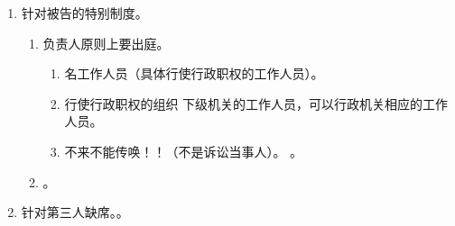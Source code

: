 \begin{enumerate}
\begin{enumerate}
\begin{kk}{一改二撤三裁}
\begin{enumerate}
\begin{enumerate}
                          \end{enumerate}
                    \item 二撤。撤回起诉。
                    \item {}。
                          \begin{enumerate}
                            \item 是原告/上诉人的。
                            \item {}。
                            \item {}。不损害公共利益和他人合法权益。
                            \item {}。
                          \end{enumerate}
                  \end{enumerate}
                  \tcblower
                  \begin{enumerate}
                    \item 新的行为审没审看诉没诉。另行起诉、合并审理。
                    \item 没有后悔药、撤诉裁定错了走再审。
                  \end{enumerate}
                \end{kk}
          \item 针对被告的特别制度。
                \begin{enumerate}
                  \item 负责人原则上要出庭。
                        \begin{enumerate}
                          \item {} 名工作人员（具体行使行政职权的工作人员）。
                          \item {}行使行政职权的组织 \hz 下级机关的工作人员，可以行政机关相应的工作人员。
                          \item 不来不能传唤！！（不是诉讼当事人）。
                                。
                        \end{enumerate}
                  \item {}。
                \end{enumerate}
          \item 针对第三人缺席。。

\end{enumerate}
\end{enumerate}
